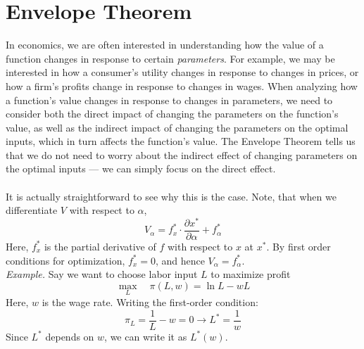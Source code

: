 \documentclass{./../../latex/handout}
\begin{document}
\section{Envelope Theorem}

In economics, we are often interested in understanding how the value of a function changes in response to certain \textit{parameters}. For example, we may be interested in how a consumer's utility changes in response to changes in prices, or how a firm's profits change in response to changes in wages. When analyzing how a function's value changes in response to changes in parameters, we need to consider both the direct impact of changing the parameters on the function's value, as well as the indirect impact of changing the parameters on the optimal inputs, which in turn affects the function's value. The Envelope Theorem tells us that we do not need to worry about the indirect effect of changing parameters on the optimal inputs --- we can simply focus on the direct effect. \\

 \\

It is actually straightforward to see why this is the case. Note, that when we differentiate $V$ with respect to $\alpha$,
\[ V_{\alpha} = f_x^* \cdot \frac{\partial x^*}{\partial \alpha} + f_{\alpha}^* \]
Here, $f_x^*$ is the partial derivative of $f$ with respect to $x$ at $x^*$. By first order conditions for optimization, $f_x^*=0$, and hence $ V_{\alpha}=f_{\alpha}^* $. \\

\textit{Example.} Say we want to choose labor input $L$ to maximize profit \[\max_L \quad\pi(L, w) = \ln L-wL\] 
Here, $w$ is the wage rate. Writing the first-order condition:
\[ \pi_L = \frac{1}{L}-w = 0 \rightarrow L^* = \frac{1}{w} \]
Since $L^*$ depends on $w$, we can write it as $L^*(w)$.
\end{document}
